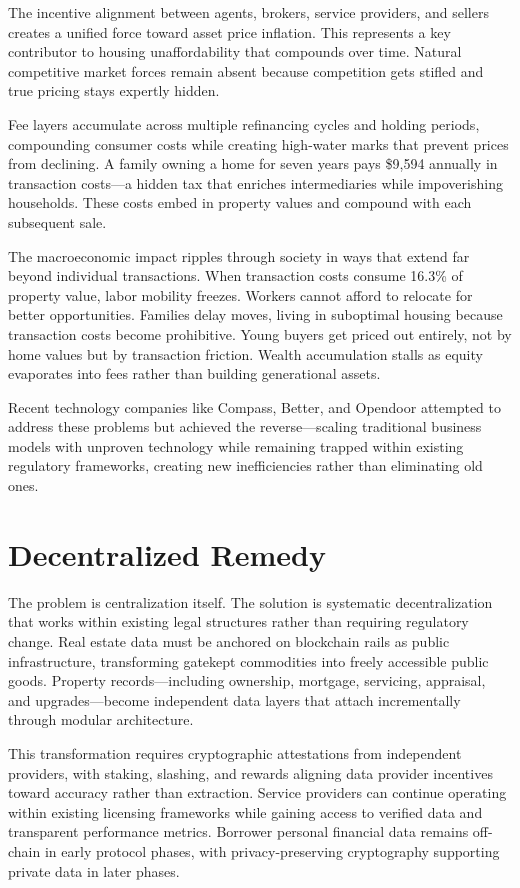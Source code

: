 The incentive alignment between agents, brokers, service providers, and sellers creates a unified force toward asset price inflation. This represents a key contributor to housing unaffordability that compounds over time. Natural competitive market forces remain absent because competition gets stifled and true pricing stays expertly hidden.

Fee layers accumulate across multiple refinancing cycles and holding periods, compounding consumer costs while creating high-water marks that prevent prices from declining. A family owning a home for seven years pays \$9,594 annually in transaction costs---a hidden tax that enriches intermediaries while impoverishing households. These costs embed in property values and compound with each subsequent sale.

The macroeconomic impact ripples through society in ways that extend far beyond individual transactions. When transaction costs consume 16.3\% of property value, labor mobility freezes. Workers cannot afford to relocate for better opportunities. Families delay moves, living in suboptimal housing because transaction costs become prohibitive. Young buyers get priced out entirely, not by home values but by transaction friction. Wealth accumulation stalls as equity evaporates into fees rather than building generational assets.

Recent technology companies like Compass, Better, and Opendoor attempted to address these problems but achieved the reverse---scaling traditional business models with unproven technology while remaining trapped within existing regulatory frameworks, creating new inefficiencies rather than eliminating old ones.

\section{Decentralized Remedy}

The problem is centralization itself. The solution is systematic decentralization that works within existing legal structures rather than requiring regulatory change. Real estate data must be anchored on blockchain rails as public infrastructure, transforming gatekept commodities into freely accessible public goods. Property records---including ownership, mortgage, servicing, appraisal, and upgrades---become independent data layers that attach incrementally through modular architecture.

This transformation requires cryptographic attestations from independent providers, with staking, slashing, and rewards aligning data provider incentives toward accuracy rather than extraction. Service providers can continue operating within existing licensing frameworks while gaining access to verified data and transparent performance metrics. Borrower personal financial data remains off-chain in early protocol phases, with privacy-preserving cryptography supporting private data in later phases.

